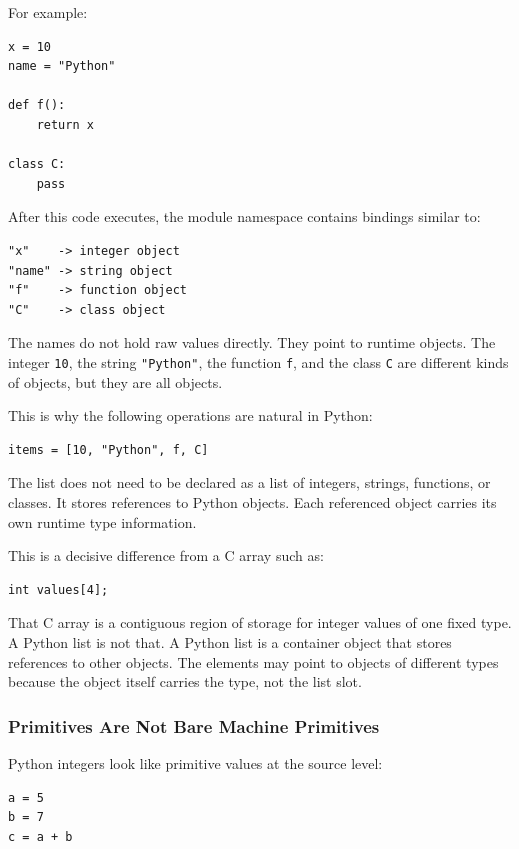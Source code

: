 For example:

\begin{verbatim}
x = 10
name = "Python"

def f():
    return x

class C:
    pass
\end{verbatim}

After this code executes, the module namespace contains bindings similar to:

\begin{verbatim}
"x"    -> integer object
"name" -> string object
"f"    -> function object
"C"    -> class object
\end{verbatim}

The names do not hold raw values directly. They point to runtime objects. The integer \texttt{10}, the string \texttt{"Python"}, the function \texttt{f}, and the class \texttt{C} are different kinds of objects, but they are all objects.

This is why the following operations are natural in Python:

\begin{verbatim}
items = [10, "Python", f, C]
\end{verbatim}

The list does not need to be declared as a list of integers, strings, functions, or classes. It stores references to Python objects. Each referenced object carries its own runtime type information.

This is a decisive difference from a C array such as:

\begin{verbatim}
int values[4];
\end{verbatim}

That C array is a contiguous region of storage for integer values of one fixed type. A Python list is not that. A Python list is a container object that stores references to other objects. The elements may point to objects of different types because the object itself carries the type, not the list slot.

\subsubsection*{Primitives Are Not Bare Machine Primitives}

Python integers look like primitive values at the source level:

\begin{verbatim}
a = 5
b = 7
c = a + b
\end{verbatim}

